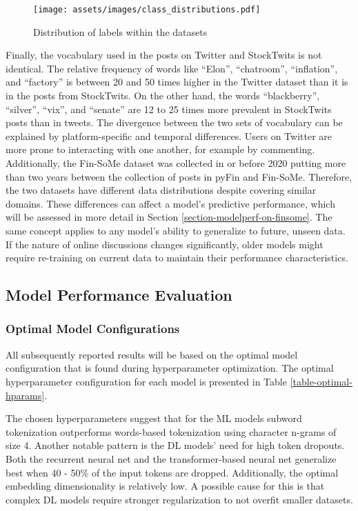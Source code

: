 \begin{figure}[!ht]
	\centering
	\texttt{[image: assets/images/class\_distributions.pdf]}
	\caption{Distribution of labels within the datasets}
	\label{figure-class-distribution}
\end{figure}

Finally, the vocabulary used in the posts on Twitter and StockTwits is not identical. The relative frequency of words like ``Elon'', ``chatroom'', ``inflation'', and ``factory'' is between 20 and 50 times higher in the Twitter dataset than it is in the posts from StockTwits. On the other hand, the words ``blackberry'', ``silver'', ``vix'', and ``senate'' are 12 to 25 times more prevalent in StockTwits posts than in tweets. The divergence between the two sets of vocabulary can be explained by platform-specific and temporal differences. Users on Twitter are more prone to interacting with one another, for example by commenting. Additionally, the Fin-SoMe dataset was collected in or before 2020 putting more than two years between the collection of posts in pyFin and Fin-SoMe. Therefore, the two datasets have different data distributions despite covering similar domains. These differences can affect a model's predictive performance, which will be assessed in more detail in Section \ref{section-modelperf-on-finsome}. The same concept applies to any model's ability to generalize to future, unseen data. If the nature of online discussions changes significantly, older models might require re-training on current data to maintain their performance characteristics.

\subsection{Model Performance Evaluation}

\subsubsection{Optimal Model Configurations}
All subsequently reported results will be based on the optimal model configuration that is found during hyperparameter optimization.
The optimal hyperparameter configuration for each model is presented in Table \ref{table-optimal-hparams}. 



The chosen hyperparameters suggest that for the ML models subword tokenization outperforms words-based tokenization using character n-grams of size 4. Another notable pattern is the DL models' need for high token dropouts. Both the recurrent neural net and the transformer-based neural net generalize best when 40 - 50\% of the input tokens are dropped. Additionally, the optimal embedding dimensionality is relatively low. A possible cause for this is that complex DL models require stronger regularization to not overfit smaller datasets.




